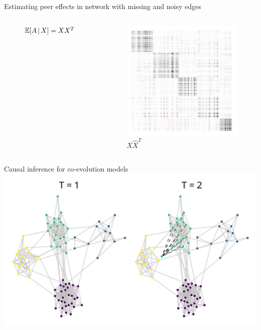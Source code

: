 \documentclass[aspectratio=169]{beamer}
\newcommand{\X}{X}
\newcommand{\Xhat}{\widehat{\X}}
\newcommand{\E}[2][]{%
	\ifthenelse{ \equal{#1}{} }
	{\ensuremath{\mathbb{E} \brac*{#2}}}
	{\ensuremath{\mathbb{E} \brac*{#2 \, \middle \vert \, #1}}}
}
\DeclarePairedDelimiter{\brac}{[}{]}
\theoremstyle{remark}
\begin{document}
\begin{frame}{Estimating peer effects in network with missing and noisy edges}
\begin{columns}
\begin{figure}
            \caption{$\E[\X]{A} = \X \X^T$}
        \end{figure}
        \begin{figure}
            \includegraphics[width=\textwidth]{figures/matrices/Phat.png}
            \caption{$\Xhat \Xhat^T$}
        \end{figure}
    \end{columns}
\end{frame}

\begin{frame}{Causal inference for co-evolution models}
    \centering
    \includegraphics{./figures/time-varying.png}
\end{frame}
\end{document}
